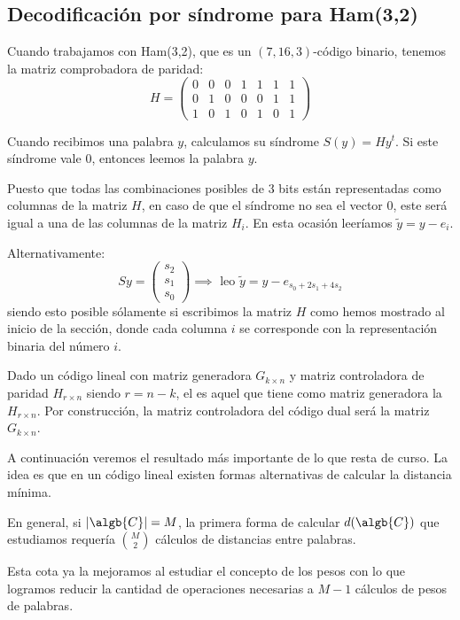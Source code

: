 \subsection{Decodificación por síndrome para Ham(3,2)}
Cuando trabajamos con Ham(3,2), que es un $(7,16,3)$-código binario, tenemos la matriz comprobadora de paridad:
\[H = \left(\begin{array}{ccccccc}
0 & 0 & 0 & 1 & 1 & 1 & 1 \\
0 & 1 & 0 & 0 & 0 & 1 & 1\\
1 & 0 & 1 & 0 & 1 & 0 & 1
\end{array}\right) \]

Cuando recibimos una palabra $y$, calculamos su síndrome $S(y)=Hy^t$. Si este síndrome vale 0, entonces leemos la palabra $y$.

Puesto que todas las combinaciones posibles de 3 bits están representadas como columnas de la matriz $H$, en caso de que el síndrome no sea el vector 0, este será igual a una de las columnas de la matriz $H_i$. En esta ocasión leeríamos $\tilde{y}=y-e_i$.

Alternativamente:
\[Sy=\left( \begin{array}{c} s_2 \\ s_1 \\ s_0 \end{array}\right) \implies \text{ leo } \tilde{y} = y-e_{s_0+2s_1+4s_2}\]
siendo esto posible sólamente si escribimos la matriz $H$ como hemos mostrado al inicio de la sección, donde cada columna $i$ se corresponde con la representación binaria del número $i$.

Dado un código lineal con matriz generadora $G_{k \times n}$ y matriz controladora de paridad $H_{r\times n}$ siendo $r=n-k$, el  es aquel que tiene como matriz generadora la $H_{r\times n}$. Por construcción, la matriz controladora del código dual será la matriz $G_{k\times n}$.

A continuación veremos el resultado más importante de lo que resta de curso. La idea es que en un código lineal existen formas alternativas de calcular la distancia mínima.

En general, si $|\algb{C}|=M$, la primera forma de calcular $d(\algb{C})$ que estudiamos requería ${M \choose 2}$ cálculos de distancias entre palabras.

Esta cota ya la mejoramos al estudiar el concepto de los pesos con lo que logramos reducir la cantidad de operaciones necesarias a $M-1$ cálculos de pesos de palabras.

